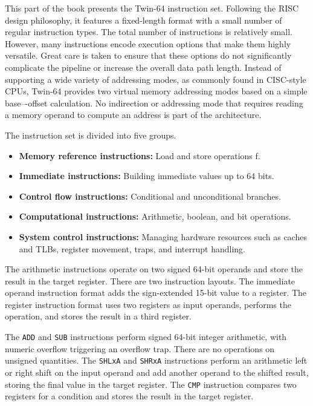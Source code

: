 %
%

This part of the book presents the Twin-64 instruction set. Following the RISC design philosophy, it features a fixed-length format with a small number of regular instruction types. The total number of instructions is relatively small. However, many instructions encode execution options that make them highly versatile. Great care is taken to ensure that these options do not significantly complicate the pipeline or increase the overall data path length. Instead of supporting a wide variety of addressing modes, as commonly found in CISC-style CPUs, Twin-64 provides two virtual memory addressing modes based on a simple base–-offset calculation. No indirection or addressing mode that requires reading a memory operand to compute an address is part of the architecture.

The instruction set is divided into five groups.  
\smallskip
\begin{itemize}
  \setlength{\itemsep}{0.5em}
  \setlength{\parskip}{0pt}
  \item \textbf{Memory reference instructions:} Load and store operations f.  
  \item \textbf{Immediate instructions:} Building immediate values up to 64 bits.  
  \item \textbf{Control flow instructions:} Conditional and unconditional branches.  
  \item \textbf{Computational instructions:} Arithmetic, boolean, and bit operations.  
  \item \textbf{System control instructions:} Managing hardware resources such as caches and TLBs, register movement, traps, and interrupt handling.  
\end{itemize}


The arithmetic instructions operate on two signed 64-bit operands and store the result in the target register. There are two instruction layouts. The immediate operand instruction format adds the sign-extended 15-bit value to a register. The register instruction format uses two registers as input operands, performs the operation, and stores the result in a third register.  

The \texttt{ADD} and \texttt{SUB} instructions perform signed 64-bit integer arithmetic, with numeric overflow triggering an overflow trap. There are no operations on unsigned quantities. The \texttt{SHLxA} and \texttt{SHRxA} instructions perform an arithmetic left or right shift on the input operand and add another operand to the shifted result, storing the final value in the target register. The \texttt{CMP} instruction compares two registers for a condition and stores the result in the target register.

